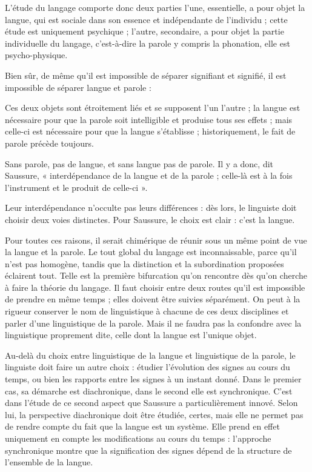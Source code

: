 \begin{lecture}{}
L’étude du langage comporte donc deux parties l’une, essentielle, a pour objet la langue, qui est sociale dans son essence et indépendante de l’individu ; cette étude est uniquement psychique ; l’autre, secondaire, a pour objet la partie individuelle du langage, c’est-à-dire la parole y compris la phonation, elle est psycho-physique.
\end{lecture}
Bien sûr, de même qu’il est impossible de séparer signifiant et signifié, il est impossible de séparer langue et parole :
\begin{lecture}{}
Ces deux objets sont étroitement liés et se supposent l’un l’autre ; la langue est nécessaire pour que la parole soit intelligible et produise tous ses effets ; mais celle-ci est nécessaire pour que la langue s’établisse ; historiquement, le fait de parole précède toujours.
\end{lecture}
Sans parole, pas de langue, et sans langue pas de parole. Il y a donc, dit Saussure, « interdépendance de la langue et de la parole ; celle-là est à la fois l’instrument et le produit de celle-ci ».

Leur interdépendance n’occulte pas leurs différences : dès lors, le linguiste doit choisir deux voies distinctes. Pour Saussure, le choix est clair : c’est la langue.
\begin{lecture}{}
Pour toutes ces raisons, il serait chimérique de réunir sous un même point de vue la langue et la parole. Le tout global du langage est inconnaissable, parce qu’il n’est pas homogène, tandis que la distinction et la subordination proposées éclairent tout. Telle est la première bifurcation qu’on rencontre dès qu’on cherche à faire la théorie du langage. Il faut choisir entre deux routes qu’il est impossible de prendre en même temps ; elles doivent être suivies séparément. On peut à la rigueur conserver le nom de linguistique à chacune de ces deux disciplines et parler d’une linguistique de la parole. Mais il ne faudra pas la confondre avec la linguistique proprement dite, celle dont la langue est l’unique objet.
\end{lecture}

Au-delà du choix entre linguistique de la langue et linguistique de la parole, le linguiste doit faire un autre choix : étudier l’évolution des signes au cours du temps, ou bien les rapports entre les signes à un instant donné. Dans le premier cas, sa démarche est diachronique, dans le second elle est synchronique. C’est dans l’étude de ce second aspect que Saussure a particulièrement innové. Selon lui, la perspective diachronique doit être étudiée, certes, mais elle ne permet pas de rendre compte du fait que la langue est un système. Elle prend en effet uniquement en compte les modifications au cours du temps : l’approche synchronique montre que la signification des signes dépend de la structure de l’ensemble de la langue.

